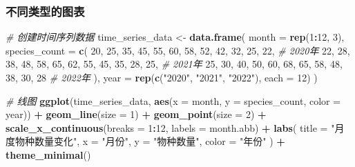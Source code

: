\documentclass[
]{book}
\newenvironment{Shaded}{\begin{snugshade}}{\end{snugshade}}
\newcommand{\AttributeTok}[1]{\textcolor[rgb]{0.13,0.29,0.53}{#1}}
\newcommand{\CommentTok}[1]{\textcolor[rgb]{0.56,0.35,0.01}{\textit{#1}}}
\newcommand{\DecValTok}[1]{\textcolor[rgb]{0.00,0.00,0.81}{#1}}
\newcommand{\FunctionTok}[1]{\textcolor[rgb]{0.13,0.29,0.53}{\textbf{#1}}}
\newcommand{\NormalTok}[1]{#1}
\newcommand{\OtherTok}[1]{\textcolor[rgb]{0.56,0.35,0.01}{#1}}
\newcommand{\SpecialCharTok}[1]{\textcolor[rgb]{0.81,0.36,0.00}{\textbf{#1}}}
\newcommand{\StringTok}[1]{\textcolor[rgb]{0.31,0.60,0.02}{#1}}
\begin{document}
\hypertarget{ux4e0dux540cux7c7bux578bux7684ux56feux8868}{%
\subsubsection{不同类型的图表}\label{ux4e0dux540cux7c7bux578bux7684ux56feux8868}}

\begin{Shaded}
\begin{Highlighting}[]
\CommentTok{\# 创建时间序列数据}
\NormalTok{time\_series\_data }\OtherTok{\textless{}{-}} \FunctionTok{data.frame}\NormalTok{(}
  \AttributeTok{month =} \FunctionTok{rep}\NormalTok{(}\DecValTok{1}\SpecialCharTok{:}\DecValTok{12}\NormalTok{, }\DecValTok{3}\NormalTok{),}
  \AttributeTok{species\_count =} \FunctionTok{c}\NormalTok{(}
    \DecValTok{20}\NormalTok{, }\DecValTok{25}\NormalTok{, }\DecValTok{35}\NormalTok{, }\DecValTok{45}\NormalTok{, }\DecValTok{55}\NormalTok{, }\DecValTok{60}\NormalTok{, }\DecValTok{58}\NormalTok{, }\DecValTok{52}\NormalTok{, }\DecValTok{42}\NormalTok{, }\DecValTok{32}\NormalTok{, }\DecValTok{25}\NormalTok{, }\DecValTok{22}\NormalTok{,  }\CommentTok{\# 2020年}
    \DecValTok{22}\NormalTok{, }\DecValTok{28}\NormalTok{, }\DecValTok{38}\NormalTok{, }\DecValTok{48}\NormalTok{, }\DecValTok{58}\NormalTok{, }\DecValTok{65}\NormalTok{, }\DecValTok{62}\NormalTok{, }\DecValTok{55}\NormalTok{, }\DecValTok{45}\NormalTok{, }\DecValTok{35}\NormalTok{, }\DecValTok{28}\NormalTok{, }\DecValTok{25}\NormalTok{,  }\CommentTok{\# 2021年}
    \DecValTok{25}\NormalTok{, }\DecValTok{30}\NormalTok{, }\DecValTok{40}\NormalTok{, }\DecValTok{50}\NormalTok{, }\DecValTok{60}\NormalTok{, }\DecValTok{68}\NormalTok{, }\DecValTok{65}\NormalTok{, }\DecValTok{58}\NormalTok{, }\DecValTok{48}\NormalTok{, }\DecValTok{38}\NormalTok{, }\DecValTok{30}\NormalTok{, }\DecValTok{28}   \CommentTok{\# 2022年}
\NormalTok{  ),}
  \AttributeTok{year =} \FunctionTok{rep}\NormalTok{(}\FunctionTok{c}\NormalTok{(}\StringTok{"2020"}\NormalTok{, }\StringTok{"2021"}\NormalTok{, }\StringTok{"2022"}\NormalTok{), }\AttributeTok{each =} \DecValTok{12}\NormalTok{)}
\NormalTok{)}

\CommentTok{\# 线图}
\FunctionTok{ggplot}\NormalTok{(time\_series\_data, }\FunctionTok{aes}\NormalTok{(}\AttributeTok{x =}\NormalTok{ month, }\AttributeTok{y =}\NormalTok{ species\_count, }\AttributeTok{color =}\NormalTok{ year)) }\SpecialCharTok{+}
  \FunctionTok{geom\_line}\NormalTok{(}\AttributeTok{size =} \DecValTok{1}\NormalTok{) }\SpecialCharTok{+}
  \FunctionTok{geom\_point}\NormalTok{(}\AttributeTok{size =} \DecValTok{2}\NormalTok{) }\SpecialCharTok{+}
  \FunctionTok{scale\_x\_continuous}\NormalTok{(}\AttributeTok{breaks =} \DecValTok{1}\SpecialCharTok{:}\DecValTok{12}\NormalTok{, }\AttributeTok{labels =}\NormalTok{ month.abb) }\SpecialCharTok{+}
  \FunctionTok{labs}\NormalTok{(}
    \AttributeTok{title =} \StringTok{"月度物种数量变化"}\NormalTok{,}
    \AttributeTok{x =} \StringTok{"月份"}\NormalTok{,}
    \AttributeTok{y =} \StringTok{"物种数量"}\NormalTok{,}
    \AttributeTok{color =} \StringTok{"年份"}
\NormalTok{  ) }\SpecialCharTok{+}
  \FunctionTok{theme\_minimal}\NormalTok{()}


\end{Highlighting}
\end{Shaded}
\end{document}
